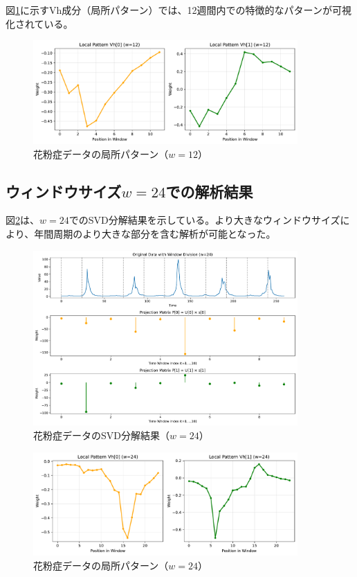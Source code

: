 \documentclass[a4paper,11pt]{jsarticle}
\begin{document}
図\ref{fig:kafunsho-vh-w12}に示すVh成分（局所パターン）では、12週間内での特徴的なパターンが可視化されている。

\begin{figure}[H]
\centering
\includegraphics[width=0.9\textwidth]{figures/fig3_kafunsho_vh_w12.pdf}
\caption{花粉症データの局所パターン（$w=12$）}
\label{fig:kafunsho-vh-w12}
\end{figure}

\subsection{ウィンドウサイズ$w=24$での解析結果}

図\ref{fig:kafunsho-svd-w24}は、$w=24$でのSVD分解結果を示している。より大きなウィンドウサイズにより、年間周期のより大きな部分を含む解析が可能となった。

\begin{figure}[H]
\centering
\includegraphics[width=0.9\textwidth]{figures/fig4_kafunsho_svd_w24.pdf}
\caption{花粉症データのSVD分解結果（$w=24$）}
\label{fig:kafunsho-svd-w24}
\end{figure}

\begin{figure}[H]
\centering
\includegraphics[width=0.9\textwidth]{figures/fig5_kafunsho_vh_w24.pdf}
\caption{花粉症データの局所パターン（$w=24$）}
\label{fig:kafunsho-vh-w24}
\end{figure}
\end{document}
